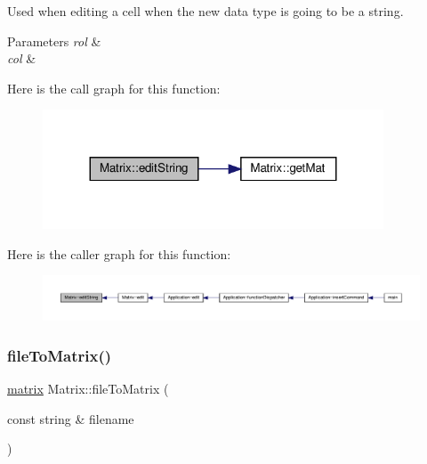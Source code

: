 Used when editing a cell when the new data type is going to be a string. 
\begin{DoxyParams}{Parameters}
{\em rol} & \\
\hline
{\em col} & \\
\hline
\end{DoxyParams}
Here is the call graph for this function\+:
\nopagebreak
\begin{figure}[H]
\begin{center}
\leavevmode
\includegraphics[width=287pt]{class_matrix_a7029d8a3cd3c691b46adfd777abc880c_cgraph}
\end{center}
\end{figure}
Here is the caller graph for this function\+:
\nopagebreak
\begin{figure}[H]
\begin{center}
\leavevmode
\includegraphics[width=350pt]{class_matrix_a7029d8a3cd3c691b46adfd777abc880c_icgraph}
\end{center}
\end{figure}
\mbox{\label{class_matrix_a35eb9dcb01c552fea1f5926db35339ef}} 
\subsubsection{\texorpdfstring{file\+To\+Matrix()}{fileToMatrix()}}
{\footnotesize\ttfamily \hyperlink{formula_8h_a869e2a5deeb3daa4c82d6bc91cf20d92}{matrix} Matrix\+::file\+To\+Matrix (\begin{DoxyParamCaption}\item[{const string \&}]{filename }\end{DoxyParamCaption})}

